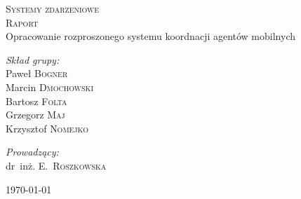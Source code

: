 \begin{titlepage}
  \begin{center}
    

    \textsc{\Large Systemy zdarzeniowe}\\[3cm]
    
    \centering{\HRule \\[0.5cm]}
	      {\LARGE  \textsc{Raport}\\[0.4cm]}
	      {\Large Opracowanie rozproszonego systemu koordnacji
                agentów mobilnych}
	      \centering{\HRule \\[1.5cm]}
	      
	      \begin{minipage}{0.4\textwidth}
	        \begin{flushleft} \large
	          \emph{Skład grupy:}\\
	          Paweł \textsc{Bogner} \\
	          Marcin \textsc{Dmochowski} \\
	          Bartosz \textsc{Folta} \\	
	          Grzegorz \textsc{Maj} \\
	          Krzysztof \textsc{Nomejko} \\
		  
		  
	        \end{flushleft}
	      \end{minipage}
	      \begin{minipage}[b]{0.4\textwidth}
	        \begin{flushright} \large
		  \emph{Prowadzący:} \\
		  dr~inż. E.~\textsc{Roszkowska}
	        \end{flushright}

	      \end{minipage}
	      \vfill
	          {\large \today}

  \end{center}
\end{titlepage}
